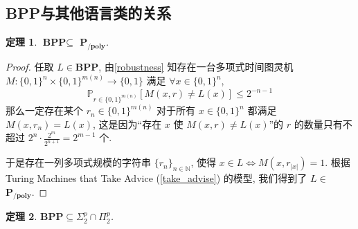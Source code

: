 \documentclass[8pt]{article}
\theoremstyle{compact}
\newtheorem{theorem}{定理}[section]
\def\le{\leqslant}
\def\PPOLY{$\textbf{P}_{\textbf{/poly}}$}
\def\BPP{\textbf{BPP}}
\begin{document}
\subsection{\BPP 与其他语言类的关系}
\begin{theorem}
	$\BPP \subseteq $ \PPOLY.
\end{theorem}
\begin{proof}
	任取 $L \in \BPP$, 由\cref{robustness} 知存在一台多项式时间图灵机 $M: \{0, 1\}^n \times \{0, 1\}^{m(n)} \to \{0, 1\}$ 满足 $\forall x \in \{0, 1\}^n$, $$\mathbb P_{r \in \{0, 1\}^{m(n)}}[M(x, r) \neq L(x)] \le 2^{-n-1}$$ 那么一定存在某个 $r_n \in \{0, 1\}^{m(n)}$ 对于所有 $x \in \{0, 1\}^n$ 都满足 $M(x, r_n) = L(x)$, 这是因为“存在 $x$ 使 $M(x, r) \neq L(x)$”的 $r$ 的数量只有不超过 $2^n \cdot \frac{2^m}{2^{n+1}} = 2^{m-1}$ 个.

	于是存在一列多项式规模的字符串 $\{r_n\}_{n \in \mathbb N}$, 使得 $x \in L \Leftrightarrow M(x, r_{|x|}) = 1$. 根据 Turing Machines that Take Advice (\cref{take_advise}) 的模型, 我们得到了 $L \in $ \PPOLY.
\end{proof}
\begin{theorem}
	$\BPP \subseteq \Sigma_2^p \cap \Pi_2^p$.
\end{theorem}
\end{document}
